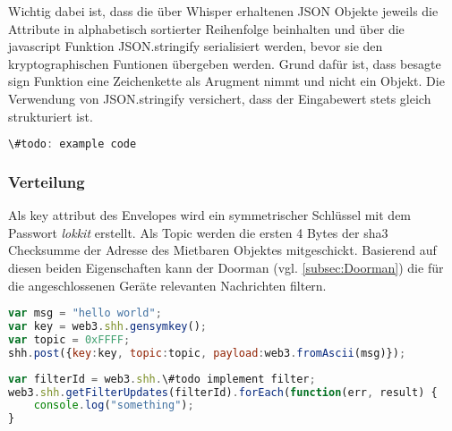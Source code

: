 Wichtig dabei ist, dass die über Whisper erhaltenen JSON Objekte jeweils die Attribute in alphabetisch sortierter Reihenfolge beinhalten und über die javascript Funktion JSON.stringify serialisiert werden, bevor sie den kryptographischen Funtionen übergeben werden. Grund dafür ist, dass besagte sign Funktion eine Zeichenkette als Arugment nimmt und nicht ein Objekt. Die Verwendung von JSON.stringify versichert, dass der Eingabewert stets gleich strukturiert ist.

\begin{lstlisting}[language=javascript,caption={beispiel generate digest und ecRecover}]
\#todo: example code
\end{lstlisting}


\subsubsection{Verteilung}
\label{sys_subsubsec:Verteilung}
Als key attribut des Envelopes wird ein symmetrischer Schlüssel mit dem Passwort \emph{lokkit} erstellt. Als Topic werden die ersten 4 Bytes der sha3 Checksumme der Adresse des Mietbaren Objektes mitgeschickt. Basierend auf diesen beiden Eigenschaften kann der Doorman (vgl. \ref{subsec:Doorman}) die für die angeschlossenen Geräte relevanten Nachrichten filtern.

\begin{lstlisting}[language=javascript,caption={Beispiel einer Whisper v5 Nachricht}]
var msg = "hello world";
var key = web3.shh.gensymkey();
var topic = 0xFFFF;
shh.post({key:key, topic:topic, payload:web3.fromAscii(msg)});
\end{lstlisting}


\begin{lstlisting}[language=javascript,caption={Beispiel eines Whisper v5 Filters}]
var filterId = web3.shh.\#todo implement filter;
web3.shh.getFilterUpdates(filterId).forEach(function(err, result) {
    console.log("something");
}
\end{lstlisting}
